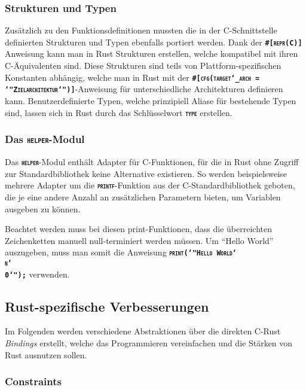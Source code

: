 \subsubsection{Strukturen und Typen}

Zusätzlich zu den Funktionsdefinitionen mussten die in der C-Schnittstelle definierten
Strukturen und Typen ebenfalls portiert werden.
Dank der \texttt{\textsc{\textbf{\#[repr(C)]}}} Anweisung kann man in Rust Strukturen erstellen,
welche kompatibel mit ihren C-Äquivalenten sind.
Diese Strukturen sind teils von Plattform-spezifischen Konstanten abhängig, welche man in Rust mit der
\texttt{\textsc{\textbf{\#[cfg(target\char`_arch = \char`"Zielarchitektur\char`")]}}}-Anweisung
für unterschiedliche Architekturen definieren kann.
Benutzerdefinierte Typen, welche prinzipiell Aliase für bestehende Typen sind, lassen sich in Rust durch das
Schlüsselwort \texttt{\textsc{\textbf{type}}} erstellen.

\subsubsection{Das \texttt{\textsc{\textbf{helper}}}-Modul}

Das \texttt{\textsc{\textbf{helper}}}-Modul enthält Adapter für C-Funktionen,
für die in Rust ohne Zugriff zur Standardbibliothek keine Alternative existieren.
So werden beispielsweise mehrere Adapter um die \texttt{\textsc{\textbf{printf}}}-Funktion aus der C-Standardbibliothek
geboten,  die je eine andere Anzahl an zusätzlichen Parametern bieten, um Variablen ausgeben zu können.

Beachtet werden muss bei diesen print-Funktionen, dass die überreichten Zeichenketten manuell
null-terminiert werden müssen. Um "`Hello World"' auszugeben, muss man somit die Anweisung
\texttt{\textsc{\textbf{print(\char`"Hello World\char`\\n\char`\\0\char`");}}} verwenden.

\subsection{Rust-spezifische Verbesserungen}

Im Folgenden werden verschiedene Abstraktionen über die direkten C-Rust \textit{Bindings} erstellt,
welche das Programmieren vereinfachen und die Stärken von Rust ausnutzen sollen.

\subsubsection{Constraints}

